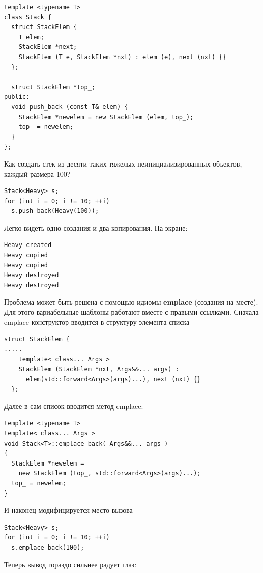 \documentclass[a4paper,12pt,oneside]{article}
\begin{document}
\begin{lstlisting}
template <typename T>
class Stack {
  struct StackElem {
    T elem;
    StackElem *next;
    StackElem (T e, StackElem *nxt) : elem (e), next (nxt) {}
  };

  struct StackElem *top_;
public:
  void push_back (const T& elem) {
    StackElem *newelem = new StackElem (elem, top_);
    top_ = newelem;
  }
};
\end{lstlisting}

Как создать стек из десяти таких тяжелых неинициализированных объектов, каждый размера 100?

\begin{lstlisting}
Stack<Heavy> s;
for (int i = 0; i != 10; ++i)
  s.push_back(Heavy(100));
\end{lstlisting}

Легко видеть одно создания и два копирования. На экране:

\begin{verbatim}
Heavy created
Heavy copied
Heavy copied
Heavy destroyed
Heavy destroyed
\end{verbatim}

Проблема может быть решена с помощью идиомы \textbf{emplace} (создания на месте). Для этого вариабельные шаблоны работают вместе с правыми ссылками. Сначала emplace конструктор вводится в структуру элемента списка

\begin{lstlisting}
struct StackElem {
.....
    template< class... Args >
    StackElem (StackElem *nxt, Args&&... args) : 
      elem(std::forward<Args>(args)...), next (nxt) {}
  };
\end{lstlisting}

Далее в сам список вводится метод emplace:

\begin{lstlisting}
template <typename T>
template< class... Args >
void Stack<T>::emplace_back( Args&&... args )
{
  StackElem *newelem = 
    new StackElem (top_, std::forward<Args>(args)...);
  top_ = newelem;
}
\end{lstlisting}

И наконец модифицируется место вызова

\begin{lstlisting}
Stack<Heavy> s;
for (int i = 0; i != 10; ++i)
  s.emplace_back(100);
\end{lstlisting}

Теперь вывод гораздо сильнее радует глаз:
\end{document}
